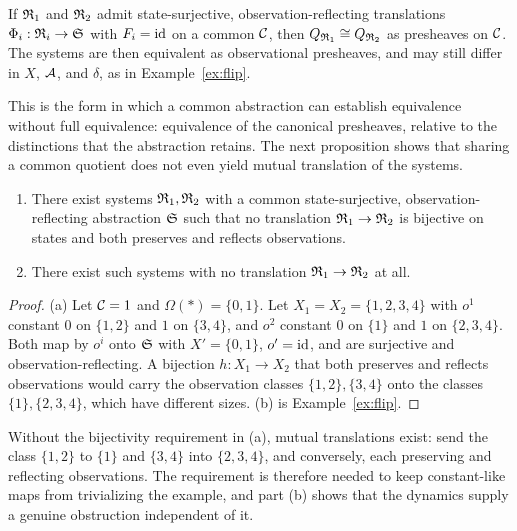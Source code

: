 \begin{corollary}\label{cor:relequiv}
If $\mathfrak R_1$ and $\mathfrak R_2$ admit state-surjective, observation-reflecting translations $\Phi_i:\mathfrak R_i\to\mathfrak S$ with $F_i=\mathrm{id}$ on a common $\mathcal C$, then $Q_{\mathfrak R_1}\cong Q_{\mathfrak R_2}$ as presheaves on $\mathcal C$. The systems are then equivalent as observational presheaves, and may still differ in $X$, $\mathcal A$, and $\delta$, as in Example~\ref{ex:flip}.
\end{corollary}

This is the form in which a common abstraction can establish equivalence without full equivalence: equivalence of the canonical presheaves, relative to the distinctions that the abstraction retains. The next proposition shows that sharing a common quotient does not even yield mutual translation of the systems.

\begin{proposition}\label{prop:commonquot}
\begin{enumerate}[label=(\alph*)]
\item There exist systems $\mathfrak R_1,\mathfrak R_2$ with a common state-surjective, observation-reflecting abstraction $\mathfrak S$ such that no translation $\mathfrak R_1\to\mathfrak R_2$ is bijective on states and both preserves and reflects observations.
\item There exist such systems with no translation $\mathfrak R_1\to\mathfrak R_2$ at all.
\end{enumerate}
\end{proposition}
\begin{proof}
(a) Let $\mathcal C=1$ and $\Omega(\ast)=\{0,1\}$. Let $X_1=X_2=\{1,2,3,4\}$ with $o^1$ constant $0$ on $\{1,2\}$ and $1$ on $\{3,4\}$, and $o^2$ constant $0$ on $\{1\}$ and $1$ on $\{2,3,4\}$. Both map by $o^i$ onto $\mathfrak S$ with $X'=\{0,1\}$, $o'=\mathrm{id}$, and are surjective and observation-reflecting. A bijection $h:X_1\to X_2$ that both preserves and reflects observations would carry the observation classes $\{1,2\},\{3,4\}$ onto the classes $\{1\},\{2,3,4\}$, which have different sizes. (b) is Example~\ref{ex:flip}.
\end{proof}

Without the bijectivity requirement in (a), mutual translations exist: send the class $\{1,2\}$ to $\{1\}$ and $\{3,4\}$ into $\{2,3,4\}$, and conversely, each preserving and reflecting observations. The requirement is therefore needed to keep constant-like maps from trivializing the example, and part (b) shows that the dynamics supply a genuine obstruction independent of it.

